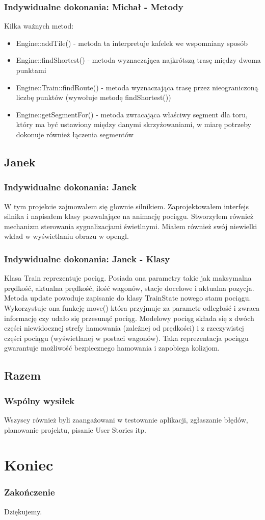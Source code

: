\documentclass[a4paper, 11pt]{beamer}
\begin{document}
\begin{frame}
\frametitle{Indywidualne dokonania: Michał - Metody}
Kilka ważnych metod:
\begin{itemize}
\item Engine::addTile() - metoda ta interpretuje kafelek we wspomniany sposób
\item Engine::findShortest() - metoda wyznaczająca najkrótszą trasę między dwoma punktami
\item Engine::Train::findRoute() - metoda wyznaczająca trasę przez nieograniczoną liczbę punktów (wywołuje metodę findShortest())
\item Engine::getSegmentFor() - metoda zwracająca właściwy segment dla toru, który ma być ustawiony między danymi skrzyżowaniami, w miarę potrzeby dokonuje również łączenia segmentów
\end{itemize}
\end{frame}
\subsection{Janek}
\begin{frame}
\frametitle{Indywidualne dokonania: Janek}
W tym projekcie zajmowałem się głownie silnikiem. Zaprojektowałem interfejs
silnika i napisałem klasy pozwalające na animację pociągu. Stworzyłem również mechanizm sterowania sygnalizacjami świetlnymi. Miałem również swój niewielki wkład w wyświetlaniu obrazu w opengl.
\end{frame}
\begin{frame}
\frametitle{Indywidualne dokonania: Janek - Klasy}
Klasa Train reprezentuje pociąg. Posiada ona parametry takie jak maksymalna
prędkość, aktualna prędkość, ilość wagonów, stacje docelowe i aktualna
pozycja. Metoda update powoduje zapisanie do klasy TrainState nowego stanu
pociągu. Wykorzystuje ona funkcję move() która przyjmuje za parametr odległość i
zwraca informację czy udało się przesunąć pociąg. Modelowy pociąg składa się z
dwóch części niewidocznej strefy hamowania (zależnej od prędkości) i z
rzeczywistej części pociągu (wyświetlanej w postaci wagonów). Taka
reprezentacja pociągu gwarantuje możliwość bezpiecznego hamowania i zapobiega
kolizjom.
\end{frame}
\subsection{Razem}
\begin{frame}
\frametitle{Wspólny wysiłek}
Wszyscy również byli zaangażowani w testowanie aplikacji, zgłaszanie błędów, planowanie projektu, pisanie User Stories itp.
\end{frame}
\section{Koniec}
\begin{frame}
\frametitle{Zakończenie}
Dziękujemy.
\end{frame}
\end{document}
